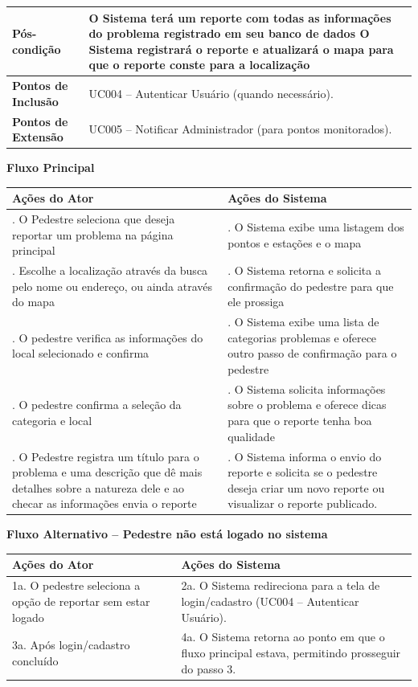 \documentclass[12pt,a4paper]{article}
\begin{document}
\begin{longtable}{|>{\raggedright\arraybackslash}p{3.5cm}|>{\raggedright\arraybackslash}p{10cm}|}
\hline
\textbf{Pós-condição} & O Sistema terá um reporte com todas as informações do problema registrado em seu banco de dados \newline O Sistema registrará o reporte e atualizará o mapa para que o reporte conste para a localização \\
\hline
\textbf{Pontos de Inclusão} & UC004 – Autenticar Usuário (quando necessário). \\
\hline
\textbf{Pontos de Extensão} & UC005 – Notificar Administrador (para pontos monitorados). \\
\hline
\end{longtable}

\textbf{Fluxo Principal}

\begin{longtable}{|>{\raggedright\arraybackslash}p{7cm}|>{\raggedright\arraybackslash}p{7cm}|}
\hline
\textbf{Ações do Ator} & \textbf{Ações do Sistema} \\
\hline
1. O Pedestre seleciona que deseja reportar um problema na página principal & 2. O Sistema exibe uma listagem dos pontos e estações e o mapa \\
\hline
3. Escolhe a localização através da busca pelo nome ou endereço, ou ainda através do mapa & 4. O Sistema retorna e solicita a confirmação do pedestre para que ele prossiga \\
\hline
5. O pedestre verifica as informações do local selecionado e confirma & 6. O Sistema exibe uma lista de categorias problemas e oferece outro passo de confirmação para o pedestre \\
\hline
7. O pedestre confirma a seleção da categoria e local & 8. O Sistema solicita informações sobre o problema e oferece dicas para que o reporte tenha boa qualidade \\
\hline
9. O Pedestre registra um título para o problema e uma descrição que dê mais detalhes sobre a natureza dele e ao checar as informações envia o reporte & 10. O Sistema informa o envio do reporte e solicita se o pedestre deseja criar um novo reporte ou visualizar o reporte publicado. \\
\hline
\end{longtable}

\textbf{Fluxo Alternativo – Pedestre não está logado no sistema}

\begin{longtable}{|>{\raggedright\arraybackslash}p{7cm}|>{\raggedright\arraybackslash}p{7cm}|}
\hline
\textbf{Ações do Ator} & \textbf{Ações do Sistema} \\
\hline
1a. O pedestre seleciona a opção de reportar sem estar logado & 2a. O Sistema redireciona para a tela de login/cadastro (UC004 – Autenticar Usuário). \\
\hline
3a. Após login/cadastro concluído & 4a. O Sistema retorna ao ponto em que o fluxo principal estava, permitindo prosseguir do passo 3. \\
\hline
\end{longtable}
\end{document}
